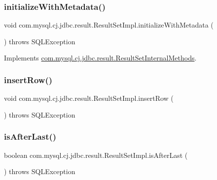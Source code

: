\subsubsection{\texorpdfstring{initialize\+With\+Metadata()}{initializeWithMetadata()}}
{\footnotesize\ttfamily void com.\+mysql.\+cj.\+jdbc.\+result.\+Result\+Set\+Impl.\+initialize\+With\+Metadata (\begin{DoxyParamCaption}{ }\end{DoxyParamCaption}) throws S\+Q\+L\+Exception}



Implements \mbox{\hyperlink{interfacecom_1_1mysql_1_1cj_1_1jdbc_1_1result_1_1_result_set_internal_methods_aee66378b04271c5eacc9811a8d884a06}{com.\+mysql.\+cj.\+jdbc.\+result.\+Result\+Set\+Internal\+Methods}}.

\mbox{\label{classcom_1_1mysql_1_1cj_1_1jdbc_1_1result_1_1_result_set_impl_a3be625f1dc24e0768f9c8d3cfb731443}} 
\subsubsection{\texorpdfstring{insert\+Row()}{insertRow()}}
{\footnotesize\ttfamily void com.\+mysql.\+cj.\+jdbc.\+result.\+Result\+Set\+Impl.\+insert\+Row (\begin{DoxyParamCaption}{ }\end{DoxyParamCaption}) throws S\+Q\+L\+Exception}

\mbox{\label{classcom_1_1mysql_1_1cj_1_1jdbc_1_1result_1_1_result_set_impl_a8f70cf5377b2ebf196c98c1c23b2bd64}} 
\subsubsection{\texorpdfstring{is\+After\+Last()}{isAfterLast()}}
{\footnotesize\ttfamily boolean com.\+mysql.\+cj.\+jdbc.\+result.\+Result\+Set\+Impl.\+is\+After\+Last (\begin{DoxyParamCaption}{ }\end{DoxyParamCaption}) throws S\+Q\+L\+Exception}

